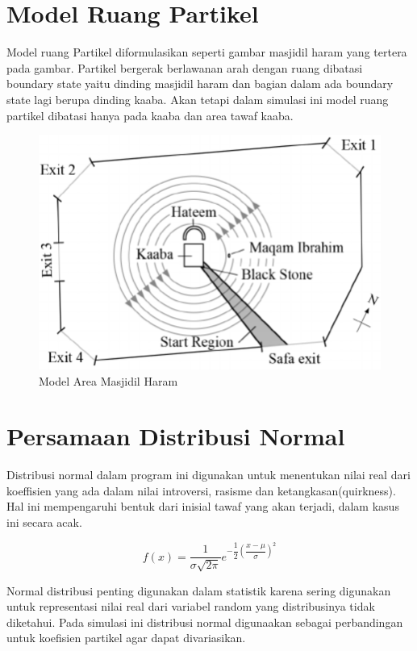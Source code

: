 \section{Model Ruang Partikel}\label{sec:ruangpartikel}

\hspace {0.5cm}Model ruang Partikel diformulasikan seperti gambar masjidil haram yang tertera pada gambar. Partikel bergerak berlawanan arah dengan ruang dibatasi boundary state yaitu dinding masjidil haram dan bagian dalam ada boundary state lagi berupa dinding kaaba. Akan tetapi dalam simulasi ini model ruang partikel dibatasi hanya pada kaaba dan area tawaf kaaba.
\begin{figure}
\centering
\includegraphics[scale=0.5]{gambar/layout2dmasjidilharam}
\caption{Model Area Masjidil Haram}
\end{figure}

\section{Persamaan Distribusi Normal }\label{sec:modelpartikel}
\hspace{0.5cm} Distribusi normal dalam program ini digunakan untuk menentukan nilai real dari koeffisien yang ada dalam nilai introversi, rasisme dan ketangkasan(quirkness). Hal ini mempengaruhi bentuk dari inisial tawaf yang akan terjadi, dalam kasus ini secara acak. 

\begin{equation}
f(x) =\dfrac{1}{\sigma \sqrt{2 \pi}} e^{-\dfrac{1}{2}(\dfrac{x-\mu}{\sigma})^2}
\end{equation}

\hspace{0.5cm} Normal distribusi penting digunakan dalam statistik karena sering digunakan untuk representasi nilai real dari variabel random yang distribusinya tidak diketahui\citep{Caseberg2009}. Pada simulasi ini distribusi normal digunaakan sebagai perbandingan untuk koefisien  partikel  agar dapat divariasikan.





